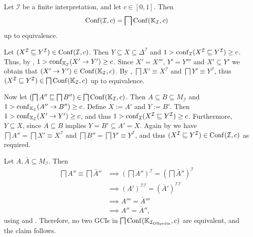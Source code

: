 \begin{Corollary}
  \label{cor:Conf-from-K_I}
  Let $\mathcal{I}$ be a finite interpretation, and let $c \in [0,1]$.  Then
  \begin{equation*}
    \operatorname{Conf}(\mathcal{I}, c) = \bigsqcap \operatorname{Conf}({\mathbb{K}}_{\mathcal{I}}, c)
  \end{equation*}
  up to equivalence.
\end{Corollary}
\begin{Proof}
  Let $(X^{\mathcal{I}} \sqsubseteq Y^{\mathcal{I}}) \in \operatorname{Conf}(\mathcal{I}, c)$.  Then $Y
  \subseteq X \subseteq \Delta^{\mathcal{I}}$ and $1 > \operatorname{conf}_{\mathcal{I}}(X^{\mathcal{I}}
  \sqsubseteq Y^{\mathcal{I}}) \ge c$.  Thus, by
  , $1 > \operatorname{conf}_{{\mathbb{K}}_{\mathcal{I}}}(X'
  \to Y') \ge c$.  Since $X' = X'''$, $Y' = Y'''$ and $X' \subseteq Y'$ we obtain that
  $(X' \to Y') \in \operatorname{Conf}({\mathbb{K}}_{\mathcal{I}}, c)$.  By
  , $\bigsqcap X' \equiv X^{\mathcal{I}}$ and
  $\bigsqcap Y' \equiv Y^{\mathcal{I}}$, thus $(X^{\mathcal{I}} \sqsubseteq
  Y^{\mathcal{I}}) \in \bigsqcap \operatorname{Conf}({\mathbb{K}}_{\mathcal{I}}, c)$ up to equivalence.

  Now let $(\bigsqcap A'' \sqsubseteq \bigsqcap B'') \in \bigsqcap \operatorname{Conf}({\mathbb{K}}_{\mathcal{I}}, c)$.  Then $A \subseteq B \subseteq M_{\mathcal{I}}$ and $1 >
  \operatorname{conf}_{{\mathbb{K}}_{\mathcal{I}}}(A'' \to B'') \ge c$.  Define $X := A'$ and $Y := B'$.  Then
  $1 > \operatorname{conf}_{{\mathbb{K}}_{\mathcal{I}}}(X' \to Y') \ge c$, and thus $1 >
  \operatorname{conf}_{\mathcal{I}}(X^{\mathcal{I}} \sqsubseteq Y^{\mathcal{I}}) \ge c$.  Furthermore,
  $Y \subseteq X$, since $A \subseteq B$ implies $Y = B' \subseteq A' = X$.  Again by
   we have $\bigsqcap A'' = \bigsqcap X' \equiv
  X^{\mathcal{I}}$ and $\bigsqcap B'' = \bigsqcap Y' \equiv Y^{\mathcal{I}}$, and thus
  $(X^{\mathcal{I}} \sqsubseteq Y^{\mathcal{I}}) \in \operatorname{Conf}(\mathcal{I}, c)$ as required.

  Let $A, \bar A \subseteq M_{\mathcal{I}}$.  Then
  \begin{align*}
    \bigsqcap A'' \equiv \bigsqcap \bar A''
    &\implies (\bigsqcap A'')^{\mathcal{I}} = (\bigsqcap \bar A'')^{\mathcal{I}} \\
    &\implies (A')^{\mathcal{I}\mathcal{I}} = (\bar A')^{\mathcal{I}\mathcal{I}} \\
    &\implies A''' = \bar A''' \\
    &\implies A'' = \bar A'',
  \end{align*}
  using  and .  Therefore,
  no two GCIs in $\bigsqcap \operatorname{Conf}({\mathbb{K}}_{{\mathcal{I}_{\text{DBpedia}}}}, c)$ are equivalent, and the claim
  follows.
\end{Proof}

